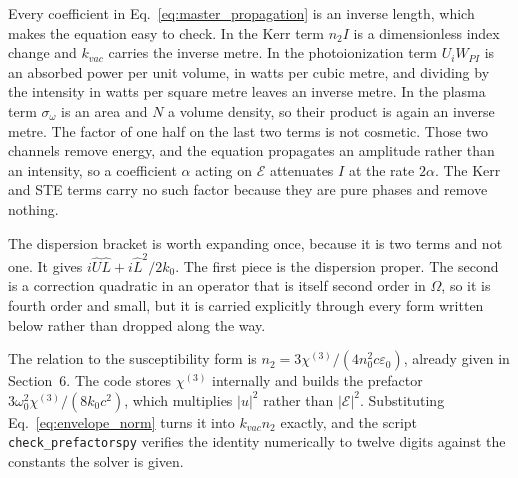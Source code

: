 Every coefficient in Eq.~\eqref{eq:master_propagation} is an inverse length, which makes the equation easy to check. In the Kerr term $n_2 I$ is a dimensionless index change and $k_{vac}$ carries the inverse metre. In the photoionization term $U_i W_{PI}$ is an absorbed power per unit volume, in watts per cubic metre, and dividing by the intensity in watts per square metre leaves an inverse metre. In the plasma term $\sigma_\omega$ is an area and $N$ a volume density, so their product is again an inverse metre. The factor of one half on the last two terms is not cosmetic. Those two channels remove energy, and the equation propagates an amplitude rather than an intensity, so a coefficient $\alpha$ acting on $\mathcal{E}$ attenuates $I$ at the rate $2\alpha$. The Kerr and STE terms carry no such factor because they are pure phases and remove nothing.

The dispersion bracket is worth expanding once, because it is two terms and not one. It gives $i\hat{U}\hat{L} + i\hat{L}^2/2k_0$. The first piece is the dispersion proper. The second is a correction quadratic in an operator that is itself second order in $\Omega$, so it is fourth order and small, but it is carried explicitly through every form written below rather than dropped along the way.

The relation to the susceptibility form is $n_2 = 3\chi^{(3)}/(4n_0^2c\varepsilon_0)$, already given in Section~6. The code stores $\chi^{(3)}$ internally and builds the prefactor $3\omega_0^2\chi^{(3)}/(8k_0c^2)$, which multiplies $|u|^2$ rather than $|\mathcal{E}|^2$. Substituting Eq.~\eqref{eq:envelope_norm} turns it into $k_{vac}n_2$ exactly, and the script \texttt{check\_prefactors\dotb py} verifies the identity numerically to twelve digits against the constants the solver is given.

